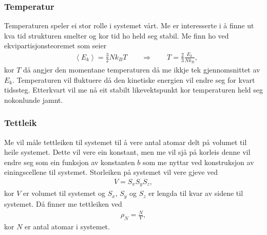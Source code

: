 \documentclass[12pt, a4paper]{article}
\theoremstyle{definition}
\begin{document}
        \subsubsection*{Temperatur}
            Temperaturen speler ei stor rolle i systemet vårt. Me er interesserte i å finne ut kva tid strukturen smelter og kor tid ho held seg stabil. Me finn ho 
            ved ekvipartisjonsteoremet som seier
            \begin{align*}
                &\left \langle E_{k} \right \rangle = \frac{3}{2} Nk_{B}T \qquad \Rightarrow \qquad T = \frac{2}{3}\frac{E_{k}}{Nk_{B}},
            \end{align*}
            kor $T$ då angjer den momentane temperaturen då me ikkje tek gjennomsnittet av $E_{k}$. Temperaturen vil fluktuere då den kinetiske energien vil endre seg for
            kvart tidssteg. Etterkvart vil me nå eit stabilt likevektspunkt kor temperaturen held seg nokonlunde jamnt.


        \subsubsection*{Tettleik}
            Me vil måle tettleiken til systemet til å vere antal atomar delt på volumet til heile systemet. Dette vil vere ein konstant, men me vil sjå på korleis denne vil 
            endre seg som ein funksjon av konstanten $b$ som me nyttar ved konstruksjon av einingscellene til systemet. Storleiken på systemet vil vere gjeve ved
            \begin{align*}
                V = S_xS_yS_z,
            \end{align*}
            kor $V$ er volumet til systemet og $S_x$, $S_y$ og $S_z$ er lengda til kvar av sidene til systemet. Då finner me tettleiken ved
            \begin{align*}
                \rho_N = \frac{N}{V},
            \end{align*}
            kor $N$ er antal atomar i systemet.
\end{document}
